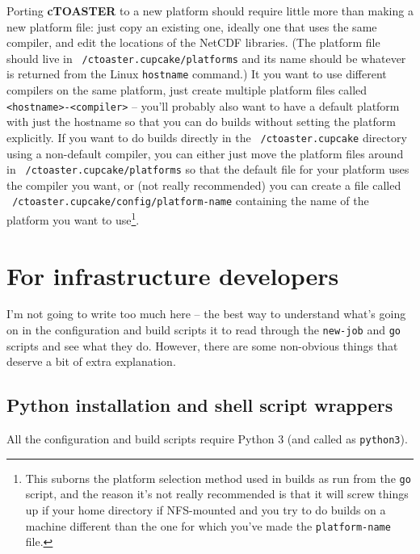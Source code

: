 \documentclass[a4paper,10pt,article]{memoir}
\begin{document}
Porting \textbf{cTOASTER} to a new platform should require little more than making
a new platform file: just copy an existing one, ideally one that uses
the same compiler, and edit the locations of the NetCDF libraries.
(The platform file should live in \texttt{~/ctoaster.cupcake/platforms} and its
name should be whatever is returned from the Linux \texttt{hostname}
command.)  It you want to use different compilers on the same
platform, just create multiple platform files called
\texttt{<hostname>-<compiler>} -- you'll probably also want to have a
default platform with just the hostname so that you can do builds
without setting the platform explicitly.  If you want to do builds
directly in the \texttt{~/ctoaster.cupcake} directory using a non-default
compiler, you can either just move the platform files around in
\texttt{~/ctoaster.cupcake/platforms} so that the default file for your platform
uses the compiler you want, or (not really recommended) you can create
a file called \texttt{~/ctoaster.cupcake/config/platform-name} containing the
name of the platform you want to use\footnote{This suborns the
  platform selection method used in builds as run from the \texttt{go}
  script, and the reason it's not really recommended is that it will
  screw things up if your home directory if NFS-mounted and you try to
  do builds on a machine different than the one for which you've made
  the \texttt{platform-name} file.}.

\newpage

\chapter{For infrastructure developers}

I'm not going to write too much here -- the best way to understand
what's going on in the configuration and build scripts it to read
through the \texttt{new-job} and \texttt{go} scripts and see what they
do.  However, there are some non-obvious things that deserve a bit of
extra explanation.

\section{Python installation and shell script wrappers}

All the configuration and build scripts require Python 3 (and called as
\texttt{python3}).
\end{document}
